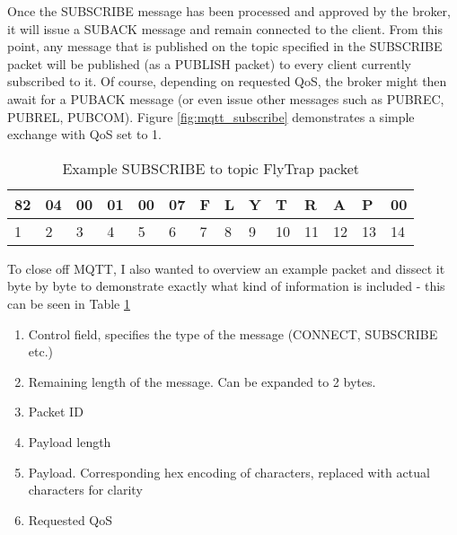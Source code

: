 Once the SUBSCRIBE message has been processed and approved by the broker, it will issue a SUBACK message and remain connected to the client. From this point, any message that is published on the topic specified in the SUBSCRIBE packet will be published (as a PUBLISH packet) to every client currently subscribed to it. Of course, depending on requested QoS, the broker might then await for a PUBACK message (or even issue other messages such as PUBREC, PUBREL, PUBCOM). Figure \ref{fig:mqtt_subscribe} demonstrates a simple exchange with QoS set to 1. 

\begin{table}[]
\centering
\begin{tabular}{llllllllllllll}
\hline
\multicolumn{1}{|l|}{82} & \multicolumn{1}{l|}{04} & \multicolumn{1}{l|}{00} & \multicolumn{1}{l|}{01} & \multicolumn{1}{l|}{00} & \multicolumn{1}{l|}{07} & \multicolumn{1}{l|}{F} & \multicolumn{1}{l|}{L} & \multicolumn{1}{l|}{Y} & \multicolumn{1}{l|}{T} & \multicolumn{1}{l|}{R} & \multicolumn{1}{l|}{A} & \multicolumn{1}{l|}{P} & \multicolumn{1}{l|}{00} \\ \hline
1                        & 2                       & 3                       & 4                       & 5                       & 6                       & 7                      & 8                      & 9                      & 10                     & 11                     & 12                     & 13                     & 14                     
\end{tabular}
\caption{Example SUBSCRIBE to topic FlyTrap packet}
\label{tab:sub_packet}
\end{table}

To close off MQTT, I also wanted to overview an example packet and dissect it byte by byte to demonstrate exactly what kind of information is included - this can be seen in Table \ref{tab:sub_packet}
\begin{enumerate}
  \item [1] Control field, specifies the type of the message (CONNECT, SUBSCRIBE etc.)
  \item [2] Remaining length of the message. Can be expanded to 2 bytes.
  \item [3-4] Packet ID
  \item [5-6] Payload length
  \item [7-13] Payload. Corresponding hex encoding of characters, replaced with actual characters for clarity
  \item [14] Requested QoS
\end{enumerate}

